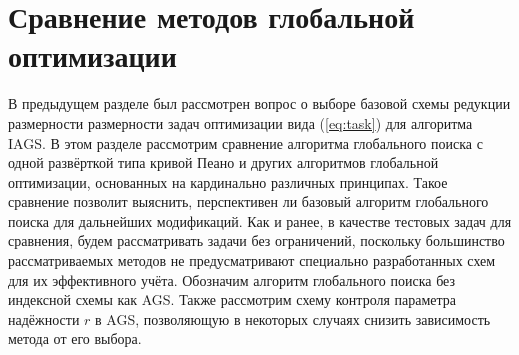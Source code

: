 \section{Сравнение методов глобальной оптимизации}

В предыдущем разделе был рассмотрен вопрос о выборе базовой схемы редукции размерности размерности задач оптимизации вида (\ref{eq:task}) для
алгоритма IAGS. В этом разделе рассмотрим сравнение алгоритма глобального поиска с одной развёрткой типа кривой Пеано
и других алгоритмов глобальной оптимизации, основанных на кардинально различных принципах. Такое сравнение позволит
выяснить, перспективен ли базовый алгоритм глобального поиска для дальнейших модификаций.
Как и ранее, в качестве тестовых задач для сравнения, будем рассматривать задачи без ограничений, поскольку большинство рассматриваемых методов
не предусматривают специально разработанных схем для их эффективного учёта.
Обозначим алгоритм глобального поиска без индексной схемы как AGS. Также рассмотрим схему контроля
параметра надёжности \(r\) в AGS, позволяющую в некоторых случаях снизить зависимость метода от его выбора.


